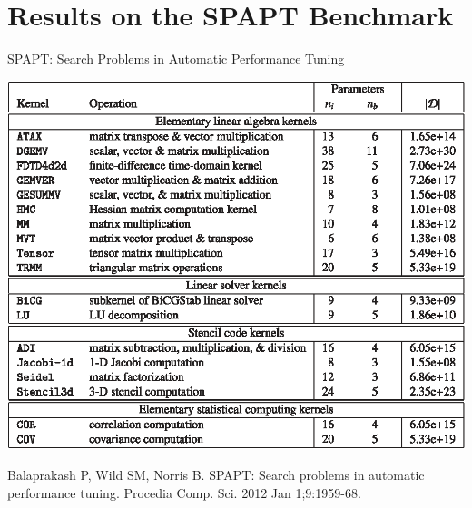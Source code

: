 \documentclass[10pt, compress, aspectratio=169, xcolor={table,usenames,dvipsnames}]{beamer}
\begin{document}
\section{Results on the SPAPT Benchmark}
\label{sec:org5b45149}
\begin{frame}[label={sec:orgfdff89d}]{SPAPT: Search Problems in Automatic Performance Tuning}
\begin{center}
\begin{center}
\includegraphics[width=.58\columnwidth]{../../img/balaprakash2012spapt.eps}
\end{center}

\vspace{-.2cm}
\scriptsize{Balaprakash P, Wild SM, Norris B. SPAPT: Search problems in automatic performance tuning. Procedia Comp. Sci. 2012 Jan 1;9:1959-68.}
\end{center}
\end{frame}
\end{document}
